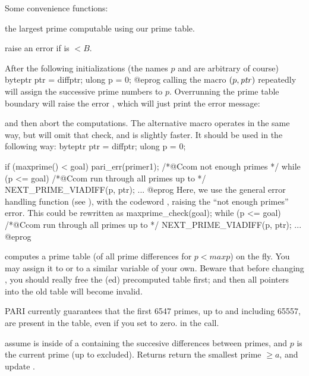\noindent Some convenience functions:

 the largest prime computable using our prime table.

 raise an error if  is $< B$.

After the following initializations (the names $p$ and  are arbitrary of
course)
\bprog
byteptr ptr = diffptr;
ulong p = 0;
@eprog
\noindent calling the macro $(p, \hbox{\it ptr\/})$
repeatedly will assign the successive prime numbers to $p$. Overrunning the
prime table boundary will raise the error , which will just
print the error message:


\noindent and then abort the computations. The alternative macro
 operates in the same way, but will omit that check, and
is slightly faster. It should be used in the following way:
%
\bprog
byteptr ptr = diffptr;
ulong p = 0;

if (maxprime() < goal) pari_err(primer1); /*@Ccom not enough primes */
while (p <= goal) /*@Ccom run through all primes up to  */
{
  NEXT_PRIME_VIADIFF(p, ptr);
  ...
}
@eprog\noindent
Here, we use the general error handling function  (see
), with the codeword , raising the ``not enough
primes'' error. This could be rewritten as
\bprog
maxprime_check(goal);
while (p <= goal) /*@Ccom run through all primes up to  */
{
  NEXT_PRIME_VIADIFF(p, ptr);
  ...
}
@eprog

 computes a prime table (of all prime
differences for $p < maxp$) on the fly. You may assign it to  or
to a similar variable of your own. Beware that before changing ,
you should really free the (ed) precomputed table first; and then
all pointers into the old table will become invalid.

PARI currently guarantees that the first 6547 primes, up to and including
65557, are present in the table, even if you set  to zero.
in the  call.

assume  is inside of a  containing the succesive
differences between primes, and $p$ is the current prime (up to 
excluded). Returns return the smallest prime $\geq a$, and update .

\vfill\eject
